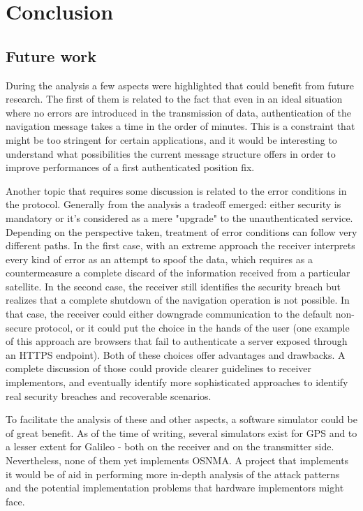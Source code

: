 \chapter{Conclusion}
\label{ch:conclusion}

\section{Future work}

During the analysis a few aspects were highlighted that could benefit from
future research. The first of them is related to the fact that even in an ideal
situation where no errors are introduced in the transmission of data,
authentication of the navigation message takes a time in the order of minutes.
This is a constraint that might be too stringent for certain applications, and
it would be interesting to understand what possibilities the current message
structure offers in order to improve performances of a first authenticated
position fix.

\vspace{\baselineskip}

Another topic that requires some discussion is related to the error conditions
in the protocol. Generally from the analysis a tradeoff emerged: either security
is mandatory or it's considered as a mere "upgrade" to the unauthenticated
service. Depending on the perspective taken, treatment of error conditions can
follow very different paths. In the first case, with an extreme approach the
receiver interprets every kind of error as an attempt to spoof the data, which
requires as a countermeasure a complete discard of the information received from
a particular satellite. In the second case, the receiver still identifies the
security breach but realizes that a complete shutdown of the navigation
operation is not possible. In that case, the receiver could either downgrade
communication to the default non-secure protocol, or it could put the choice in
the hands of the user (one example of this approach are browsers that fail to
authenticate a server exposed through an HTTPS endpoint). Both of these choices
offer advantages and drawbacks. A complete discussion of those could provide
clearer guidelines to receiver implementors, and eventually identify more
sophisticated approaches to identify real security breaches and recoverable
scenarios.

\vspace{\baselineskip}

To facilitate the analysis of these and other aspects, a software simulator
could be of great benefit. As of the time of writing, several simulators exist
for GPS and to a lesser extent for Galileo - both on the receiver and on the
transmitter side. Nevertheless, none of them yet implements OSNMA. A project
that implements it would be of aid in performing more in-depth analysis of the
attack patterns and the potential implementation problems that hardware
implementors might face.

